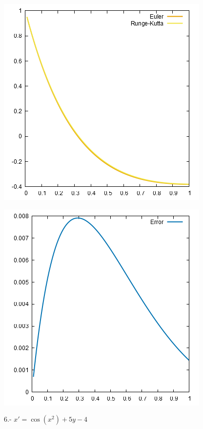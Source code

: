 \documentclass[10pt]{article}
\begin{document}
\begin{multicols}{2}
\begin{center}
				\includegraphics[scale=0.4]{../Graficas/5.png}
			\end{center}
			\begin{center}
				\includegraphics[scale=0.4]{../Graficas/5_1.png}
			\end{center}
			6.- $x'=\cos(x^2)+5y-4$
			\begin{center}

\end{center}
\end{multicols}
\end{document}
